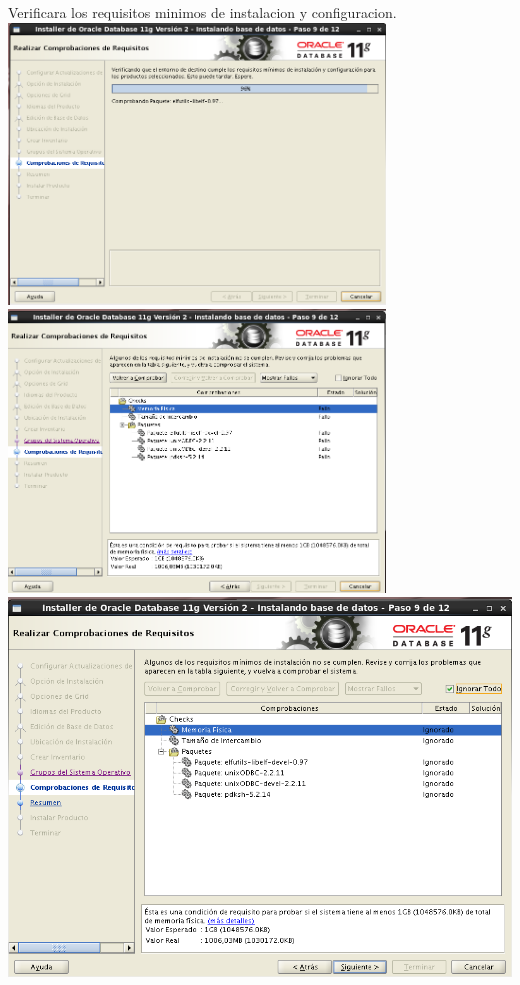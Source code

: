\documentclass[12pt,letterpaper]{article}
\begin{document}
\begin{center}
Verificara los requisitos minimos de instalacion y configuracion.\\
\includegraphics[width=10cm]{./oraclelinux/20.png}\\
\includegraphics[width=10cm]{./oraclelinux/21.png}\\
\includegraphics[width=15cm]{./oraclelinux/22.png}\\

\end{center}
\end{document}
